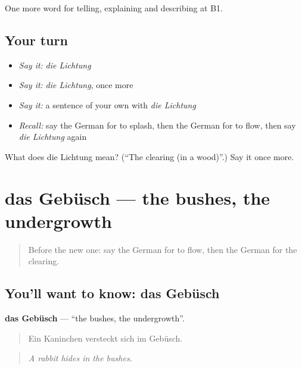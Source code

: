 \begin{grammarlens}[title={What you've built}]
One more word for telling, explaining and describing at B1.
\end{grammarlens}

\subsection*{Your turn}
\begin{itemize}
\raggedright
  \item \emph{Say it:} \emph{die Lichtung}
  \item \emph{Say it:} \emph{die Lichtung}, once more
  \item \emph{Say it:} a sentence of your own with \emph{die Lichtung}
  \item \emph{Recall:} say the German for to splash, then the German for to flow, then say \emph{die Lichtung} again
\end{itemize}

\begin{tcolorbox}[breakable,colback=teal!4,colframe=teal!35!black,title={Before you move on}]
What does die Lichtung mean? (\textquotedblleft{}The clearing (in a wood)\textquotedblright{}.) Say it once more.
\end{tcolorbox}
\section[das Gebüsch]{das Gebüsch — the bushes, the undergrowth}

\label{lesson:GE-C456-gebuesch}



\begin{quote}
Before the new one: say the German for to flow, then the German for the clearing.
\end{quote}

\subsection*{You'll want to know: das Gebüsch}
\textbf{das Gebüsch} — \textquotedblleft{}the bushes, the undergrowth\textquotedblright{}.

\begin{quote}
Ein Kaninchen versteckt sich im Gebüsch.
\end{quote}

\begin{quote}
\emph{A rabbit hides in the bushes.}
\end{quote}

